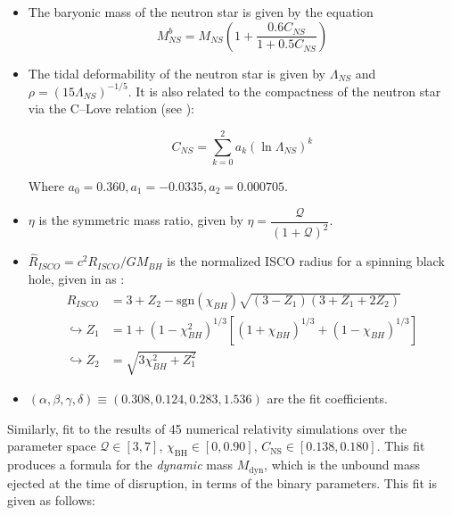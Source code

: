     \begin{itemize}

        \item The baryonic mass of the neutron star is given by the equation $$M_{NS}^b
            = M_{NS} \left(1 + \dfrac{0.6 C_{NS}}{1 + 0.5 C_{NS}} \right)$$

        \item The tidal deformability of the neutron star is given by $\Lambda_{NS}$ and
            $\rho = (15 \Lambda_{NS})^{-1/5}$. It is also related to the compactness of
            the neutron star via the C--Love relation (see \cite{yagi_2017}):

            \begin{equation}
                C_{NS} = \sum_{k=0}^{2} a_k (\ln \Lambda_{NS})^k
            \end{equation}

            Where $a_0 = 0.360, a_1 = -0.0335, a_2 = 0.000705$.

        \item $\eta$ is the symmetric mass ratio, given by $ \eta =
            \dfrac{\mathcal{Q}}{(1 + \mathcal{Q})^2} $.

        \item $\hat{R}_{ISCO} = c^2 R_{ISCO} / GM_{BH}$ is the normalized ISCO radius
            for a spinning black hole, given in \cite{bardeen_1972} as :
            \begin{align}
                \label{eq:r_isco}
                \hat{R}_{ISCO} &=
                    3 +
                    Z_2 -
                    \mathrm{sgn}(\chi_{BH}) \sqrt{(3 - Z_1)(3+Z_1 + 2Z_2)} \\
                \hookrightarrow Z_1 &=
                                1 +
                                (1 - \chi_{BH}^2)^{1/3}
                                [
                                    (1 + \chi_{BH})^{1/3} + (1 - \chi_{BH})^{1/3}
                                ] \nonumber \\
                \hookrightarrow Z_2 &=
                                \sqrt{3\chi_{BH}^2 +  Z_1^2} \nonumber
            \end{align}

        \item $(\alpha, \beta, \gamma, \delta) \equiv (0.308, 0.124, 0.283, 1.536)$ are
            the fit coefficients.

    \end{itemize}

    Similarly, \cite{kawaguchi_2016} fit to the results of 45 numerical relativity
    simulations over the parameter space $\mathcal{Q} \in [3,7]$, $\chi_{\mathrm{BH}}
    \in [0, 0.90]$, $C_{\mathrm{NS}} \in [0.138, 0.180]$. This fit produces a formula
    for the \textit{dynamic} mass $M_{\mathrm{dyn}}$, which is the unbound mass ejected
    at the time of disruption, in terms of the binary parameters. This fit is given as
    follows:

